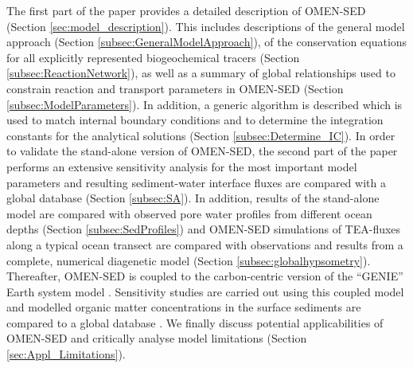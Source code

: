 \documentclass[gmd, manuscript]{copernicus}
\begin{document}
The first part of the paper provides a detailed description of OMEN-SED (Section \ref{sec:model_description}). This includes descriptions of the general model approach (Section \ref{subsec:GeneralModelApproach}), 
of the conservation equations for all explicitly represented biogeochemical tracers (Section \ref{subsec:ReactionNetwork}), as well as a summary of global relationships 
used to constrain reaction and transport parameters in OMEN-SED (Section \ref{subsec:ModelParameters}). 
In addition, a generic algorithm is described which is used to match internal boundary conditions and to determine the integration constants for the analytical solutions 
(Section \ref{subsec:Determine_IC}). 
In order to validate the stand-alone version of OMEN-SED, the second part of the paper performs an extensive sensitivity analysis for the most important model parameters and 
resulting sediment-water interface fluxes are compared with a global database (Section \ref{subsec:SA}). 
In addition, results of the stand-alone model are compared with observed pore water profiles from different ocean depths (Section \ref{subsec:SedProfiles}) and OMEN-SED 
simulations of TEA-fluxes along a typical ocean transect are compared with observations and results from a complete, numerical diagenetic model (Section \ref{subsec:globalhypsometry}). 
Thereafter, OMEN-SED is coupled to the carbon-centric version of the ``GENIE'' Earth system model \citep[cGENIE,][Section \ref{subsubsec:Methods_ESM_coupling}]{ridgwell_marine_2007}. 
Sensitivity studies are carried out using this coupled model and modelled organic matter concentrations in the surface sediments are compared to a global database \citep[][Section \ref{subsec:Parameterising_OM_rate_const}]{seiter_organic_2004}. 
We finally discuss potential applicabilities of OMEN-SED and critically analyse model limitations (Section \ref{sec:Appl_Limitations}).


\end{document}
